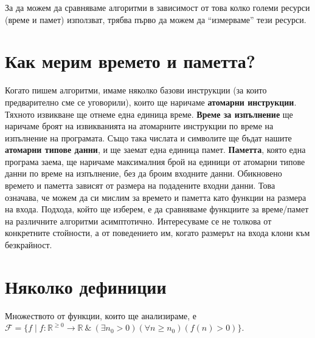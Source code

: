\documentclass{article}
\newcommand{\R}{\mathbb{R}}
\newcommand{\F}{\mathcal{F}}
\theoremstyle{definition}
\theoremstyle{plain}
\theoremstyle{remark}
\theoremstyle{definition}
\begin{document}
За да можем да сравняваме алгоритми в зависимост от това колко големи ресурси (време и памет) използват, трябва първо да можем да ``измерваме'' тези ресурси.

\section*{Как мерим времето и паметта?}

Когато пишем алгоритми, имаме няколко базови инструкции (за които предварително сме се уговорили), които ще наричаме \textbf{атомарни инструкции}.
Тяхното извикване ще отнеме една единица време.
\textbf{Време за изпълнение} ще наричаме броят на извикванията на атомарните инструкции по време на изпълнение на програмата.
Също така числата и символите ще бъдат нашите \textbf{атомарни типове данни}, и ще заемат една единица памет.
\textbf{Паметта}, която една програма заема, ще наричаме максималния брой на единици от атомарни типове данни по време на изпълнение, без да броим входните данни.
Обикновено времето и паметта зависят от размера на подадените входни данни.
Това означава, че можем да си мислим за времето и паметта като функции на размера на входа.
Подхода, който ще изберем, е да сравняваме функциите за време/памет на различните алгоритми асимптотично.
Интересуваме се не толкова от конкретните стойности, а от поведението им, когато размерът на входа клони към безкрайност.

\section*{Няколко дефиниции}
Множеството от функции, които ще анализираме, е $\F = \{ f \mid f : \R^{\geq 0} \rightarrow \R \: \& \: (\exists n_0 > 0) (\forall n \geq n_0) (f(n) > 0) \}$.
\end{document}
